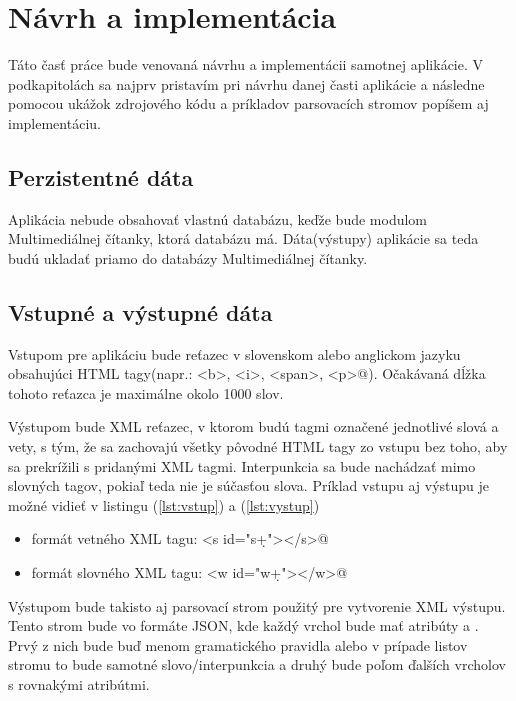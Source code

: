 \documentclass[12pt,a4paper]{report}
\theoremstyle{definition}
\theoremstyle{remark}
\begin{document}

\chapter{Návrh a implementácia}
Táto časť práce bude venovaná návrhu a implementácii samotnej aplikácie. V podkapitolách sa najprv pristavím pri návrhu danej časti aplikácie a následne pomocou ukážok zdrojového kódu a príkladov parsovacích stromov popíšem aj implementáciu.

\section{Perzistentné dáta}
Aplikácia nebude obsahovať vlastnú databázu, keďže bude modulom Multimediálnej čítanky, ktorá databázu má. Dáta(výstupy) aplikácie sa teda budú ukladať priamo do databázy Multimediálnej čítanky.

\section{Vstupné a výstupné dáta}
Vstupom pre aplikáciu bude reťazec v slovenskom alebo anglickom jazyku obsahujúci HTML tagy(napr.: \verb@<b>, <i>, <span>, <p>@). Očakávaná dĺžka tohoto reťazca je maximálne okolo 1000 slov.

Výstupom bude XML reťazec, v ktorom budú tagmi označené jednotlivé slová a vety, s tým, že sa zachovajú všetky pôvodné HTML tagy zo vstupu bez toho, aby sa prekrížili s pridanými XML tagmi. Interpunkcia sa bude nachádzať mimo slovných tagov, pokiaľ teda nie je súčasťou slova. Príklad vstupu aj výstupu je možné vidieť v listingu (\ref{lst:vstup}) a (\ref{lst:vystup})
\begin{itemize}
\item formát vetného XML tagu: \verb@<s id="s\d+"></s>@
\item formát slovného XML tagu: \verb@<w id="w\d+"></w>@
\end{itemize}

Výstupom bude takisto aj parsovací strom použitý pre vytvorenie XML výstupu. Tento strom bude vo formáte JSON, kde každý vrchol bude mať atribúty \verb@name@ a \verb@children@. Prvý z nich bude buď menom gramatického pravidla alebo v prípade listov stromu to bude samotné slovo/interpunkcia a druhý bude poľom ďalších vrcholov s rovnakými atribútmi.
\end{document}
